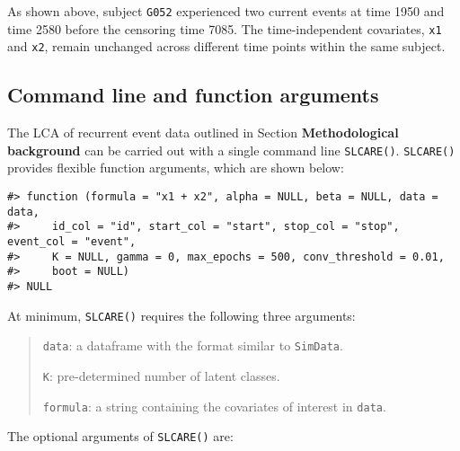 As shown above, subject \texttt{G052} experienced two current events at time 1950 and time 2580
before the censoring time 7085. The time-independent covariates, \texttt{x1} and \texttt{x2}, remain unchanged across different time points within the same subject.

\hypertarget{command-line-and-function-arguments}{%
\subsection{Command line and function arguments}\label{command-line-and-function-arguments}}

The LCA of recurrent event data outlined in Section \textbf{Methodological background} can be carried out with a single command line \texttt{SLCARE()}. \texttt{SLCARE()} provides flexible function arguments, which are shown below:

\begin{verbatim}
#> function (formula = "x1 + x2", alpha = NULL, beta = NULL, data = data, 
#>     id_col = "id", start_col = "start", stop_col = "stop", event_col = "event", 
#>     K = NULL, gamma = 0, max_epochs = 500, conv_threshold = 0.01, 
#>     boot = NULL) 
#> NULL
\end{verbatim}

At minimum, \texttt{SLCARE()} requires the following three arguments:

\begin{quote}
\texttt{data}: a dataframe with the format similar to \texttt{SimData}.

\texttt{K}: pre-determined number of latent classes.

\texttt{formula}: a string containing the covariates of interest in \texttt{data}.
\end{quote}

The optional arguments of \texttt{SLCARE()} are:

